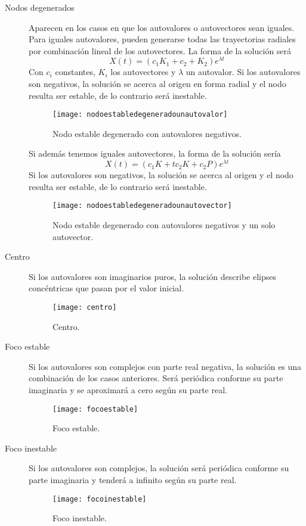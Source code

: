 \begin{description}
\item[Nodos degenerados]
Aparecen en los casos en que los autovalores o autovectores sean iguales.
Para iguales autovalores, pueden generarse todas las trayectorias radiales por combinación lineal de los autovectores. La forma de la solución será
\begin{equation}
X(t)=(c_1K_1+c_2+K_2)e^{\lambda t} \nonumber
\end{equation}
Con $c_i$ constantes, $K_i$ los autovectores y $\lambda$ un autovalor.
Si los autovalores son negativos, la solución se acerca al origen en forma radial y el nodo resulta ser estable, de lo contrario será inestable.
\begin{figure}
\centering\texttt{[image: nodoestabledegeneradounautovalor]}
\caption{Nodo estable degenerado con autovalores negativos.}
\end{figure}
Si además tenemos iguales autovectores, la forma de la solución sería
\begin{equation}
X(t)=(c_1K+tc_2K+c_2P)e^{\lambda t} \nonumber
\end{equation}
Si los autovalores son negativos, la solución se acerca al origen y el nodo resulta ser estable, de lo contrario será inestable.
\begin{figure}
\centering\texttt{[image: nodoestabledegeneradounautovector]}
\caption{Nodo estable degenerado con autovalores negativos y un solo autovector.}
\end{figure}

\item[Centro]
Si los autovalores son imaginarios puros, la solución describe elipses concéntricas que pasan por el valor inicial.
\begin{figure}
\centering\texttt{[image: centro]}
\caption{Centro.}
\end{figure}

\item[Foco estable]
Si los autovalores son complejos con parte real negativa, la solución es una combinación de los casos anteriores. Será periódica conforme su parte imaginaria y se aproximará a cero según su parte real.
%
\begin{figure}
\centering\texttt{[image: focoestable]}
\caption{Foco estable.}
\end{figure}

\item[Foco inestable]
Si los autovalores son complejos, la solución será periódica conforme su parte imaginaria y tenderá a infinito según su parte real.
%
\begin{figure}
\centering\texttt{[image: focoinestable]}
\caption{Foco inestable.}
\end{figure}

\end{description}

